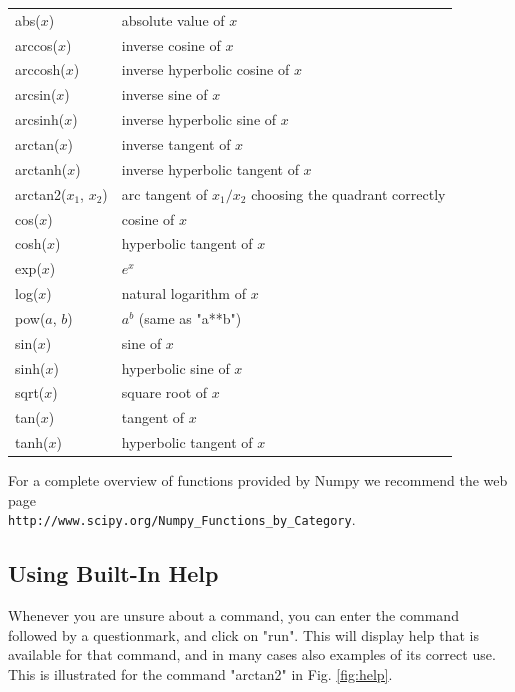 \documentclass[article,A4,12pt]{llncs}
\begin{document}
\begin{center}
\begin{tabular}{|l|l|}
\hline
abs($x$) &  absolute value of $x$\\
arccos($x$) &  inverse cosine of $x$ \\
arccosh($x$) &  inverse hyperbolic cosine of $x$ \\
arcsin($x$) & inverse sine of $x$ \\
arcsinh($x$) & inverse hyperbolic sine of $x$ \\
arctan($x$) & inverse tangent of $x$ \\
arctanh($x$) & inverse hyperbolic tangent of $x$ \\
arctan2($x_1$, $x_2$) & arc tangent of $x_1/x_2$ choosing the quadrant correctly \\
cos($x$) & cosine of $x$ \\
cosh($x$) & hyperbolic tangent of $x$ \\
exp($x$) & $e^x$ \\
log($x$) & natural logarithm of $x$ \\
pow($a$, $b$) & $a^b$ (same as "a**b")\\
sin($x$) & sine of $x$ \\
sinh($x$) & hyperbolic sine of $x$ \\
sqrt($x$) & square root of $x$ \\
tan($x$) & tangent of $x$\\
tanh($x$) & hyperbolic tangent of $x$ \\
\hline
\end{tabular}
\end{center}
\vspace{4mm}
\noindent
For a complete overview of functions provided by Numpy we recommend the 
web page \\ {\tt http://www.scipy.org/Numpy\_Functions\_by\_Category}.


\subsection{Using Built-In Help}

Whenever you are unsure about a command, you can enter the 
command followed by a questionmark, and click on "run". This will 
display help that is available for that command, and in many cases also
examples of its correct use. This is illustrated for the command 
"arctan2" in Fig. \ref{fig:help}.

\newpage
\end{document}
